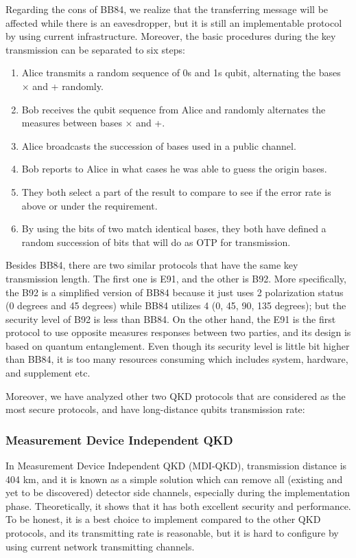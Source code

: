 \documentclass[sigconf]{acmart}
\begin{document}
Regarding the cons of BB84, we realize that the transferring message will be affected while there is an eavesdropper, but it is still an implementable protocol by using current infrastructure. Moreover, the basic procedures during the key transmission can be separated to six steps:
\begin{enumerate}
\item Alice transmits a random sequence of 0s and 1s qubit, alternating the bases × and + randomly.
\item Bob receives the qubit sequence from Alice and randomly alternates the measures between bases × and +.
\item Alice broadcasts the succession of bases used in a public channel.
\item Bob reports to Alice in what cases he was able to guess the origin bases.
\item They both select a part of the result to compare to see if the error rate is above or under the requirement.
\item By using the bits of two match identical bases, they both have defined a random succession of bits that will do as OTP for transmission.
\end{enumerate}
 
Besides BB84, there are two similar protocols that have the same key transmission length. The first one is E91, and the other is B92. More specifically, the B92 is a simplified version of BB84 because it just uses 2 polarization status (0 degrees and 45 degrees) while BB84 utilizes 4 (0, 45, 90, 135 degrees); but the security level of B92 is less than BB84. On the other hand, the E91 is the first protocol to use opposite measures responses between two parties, and its design is based on quantum entanglement. Even though its security level is little bit higher than BB84, it is too many resources consuming which includes system, hardware, and supplement etc.

Moreover, we have analyzed other two QKD protocols that are considered as the most secure protocols, and have long-distance qubits transmission rate:

\subsubsection{Measurement Device Independent QKD}
In Measurement Device Independent QKD (MDI-QKD), transmission distance is 404 km, and it is known as a simple solution which can remove all (existing and yet to be discovered) detector side channels, especially during the implementation phase. Theoretically, it shows that it has both excellent security and performance. To be honest, it is a best choice to implement compared to the other QKD protocols, and its transmitting rate is reasonable, but it is hard to configure by using current network transmitting channels.
\end{document}
